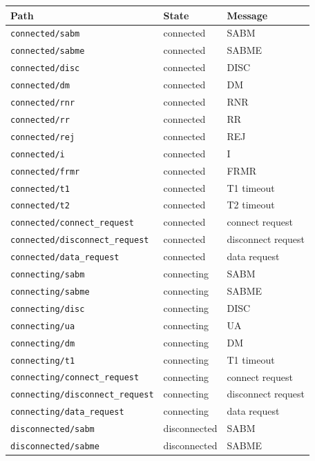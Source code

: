 \documentclass[a4paper]{article}
\begin{document}
{\scriptsize
\begin{center}
\begin{tabular}[h]{|l|l|l|}
  \hline
  Path & State & Message\\
  \hline
\verb'connected/sabm' & connected & SABM\\
  \hline
\verb'connected/sabme' & connected & SABME\\
  \hline
\verb'connected/disc' & connected & DISC\\
  \hline
\verb'connected/dm' & connected & DM\\
  \hline
\verb'connected/rnr' & connected & RNR\\
  \hline
\verb'connected/rr' & connected & RR\\
  \hline
\verb'connected/rej' & connected & REJ\\
  \hline
\verb'connected/i' & connected & I\\
  \hline
\verb'connected/frmr' & connected & FRMR\\
  \hline
\verb'connected/t1' & connected & T1 timeout\\
  \hline
\verb'connected/t2' & connected & T2 timeout\\
  \hline
\verb'connected/connect_request' & connected & connect request\\
  \hline
\verb'connected/disconnect_request' & connected & disconnect request\\
  \hline
\verb'connected/data_request' & connected & data request\\
  \hline
\verb'connecting/sabm' & connecting & SABM\\
  \hline
\verb'connecting/sabme' & connecting & SABME\\
  \hline
\verb'connecting/disc' & connecting & DISC\\
  \hline
\verb'connecting/ua' & connecting & UA\\
  \hline
\verb'connecting/dm' & connecting & DM\\
  \hline
\verb'connecting/t1' & connecting & T1 timeout\\
  \hline
\verb'connecting/connect_request' & connecting & connect request\\
  \hline
\verb'connecting/disconnect_request' & connecting & disconnect request\\
  \hline
\verb'connecting/data_request' & connecting & data request\\
  \hline
\verb'disconnected/sabm' & disconnected & SABM\\
  \hline
\verb'disconnected/sabme' & disconnected & SABME\\

\end{tabular}
\end{center}}
\end{document}
